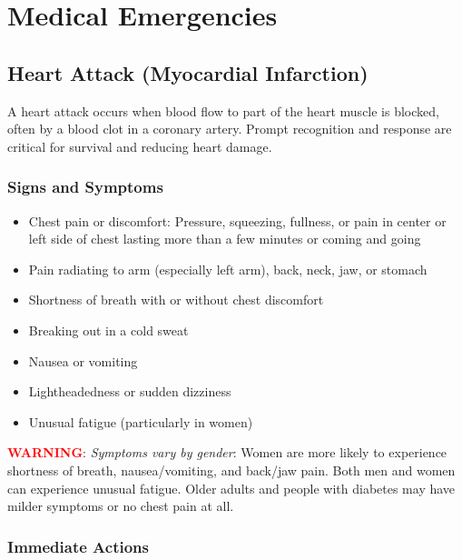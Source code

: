 \chapter{Medical Emergencies}\label{ch:medical}

\section{Heart Attack (Myocardial Infarction)}

A heart attack occurs when blood flow to part of the heart muscle is blocked, often by a blood clot in a coronary artery. Prompt recognition and response are critical for survival and reducing heart damage.

\subsection{Signs and Symptoms}

\begin{itemize}[leftmargin=*]
  \item Chest pain or discomfort: Pressure, squeezing, fullness, or pain in center or left side of chest lasting more than a few minutes or coming and going
  \item Pain radiating to arm (especially left arm), back, neck, jaw, or stomach
  \item Shortness of breath with or without chest discomfort
  \item Breaking out in a cold sweat
  \item Nausea or vomiting
  \item Lightheadedness or sudden dizziness
  \item Unusual fatigue (particularly in women)
\end{itemize}

\noindent\textbf{\textcolor{red}{WARNING}}: \textit{Symptoms vary by gender}: Women are more likely to experience shortness of breath, nausea/vomiting, and back/jaw pain. Both men and women can experience unusual fatigue. Older adults and people with diabetes may have milder symptoms or no chest pain at all.

\subsection{Immediate Actions}

